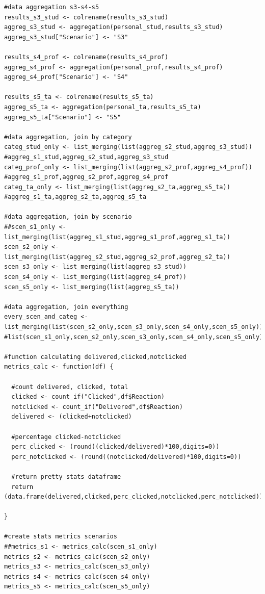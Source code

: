 \documentclass[a4paper]{article}
\begin{document}
\begin{lstlisting}
#data aggregation s3-s4-s5
results_s3_stud <- colrename(results_s3_stud)
aggreg_s3_stud <- aggregation(personal_stud,results_s3_stud)
aggreg_s3_stud["Scenario"] <- "S3"

results_s4_prof <- colrename(results_s4_prof)
aggreg_s4_prof <- aggregation(personal_prof,results_s4_prof)
aggreg_s4_prof["Scenario"] <- "S4"

results_s5_ta <- colrename(results_s5_ta)
aggreg_s5_ta <- aggregation(personal_ta,results_s5_ta)
aggreg_s5_ta["Scenario"] <- "S5"

#data aggregation, join by category
categ_stud_only <- list_merging(list(aggreg_s2_stud,aggreg_s3_stud)) #aggreg_s1_stud,aggreg_s2_stud,aggreg_s3_stud
categ_prof_only <- list_merging(list(aggreg_s2_prof,aggreg_s4_prof)) #aggreg_s1_prof,aggreg_s2_prof,aggreg_s4_prof
categ_ta_only <- list_merging(list(aggreg_s2_ta,aggreg_s5_ta)) #aggreg_s1_ta,aggreg_s2_ta,aggreg_s5_ta

#data aggregation, join by scenario
##scen_s1_only <- list_merging(list(aggreg_s1_stud,aggreg_s1_prof,aggreg_s1_ta))
scen_s2_only <- list_merging(list(aggreg_s2_stud,aggreg_s2_prof,aggreg_s2_ta))
scen_s3_only <- list_merging(list(aggreg_s3_stud))
scen_s4_only <- list_merging(list(aggreg_s4_prof))
scen_s5_only <- list_merging(list(aggreg_s5_ta))

#data aggregation, join everything
every_scen_and_categ <- list_merging(list(scen_s2_only,scen_s3_only,scen_s4_only,scen_s5_only)) #list(scen_s1_only,scen_s2_only,scen_s3_only,scen_s4_only,scen_s5_only)

#function calculating delivered,clicked,notclicked
metrics_calc <- function(df) {
  
  #count delivered, clicked, total
  clicked <- count_if("Clicked",df$Reaction)
  notclicked <- count_if("Delivered",df$Reaction)
  delivered <- (clicked+notclicked)
  
  #percentage clicked-notclicked
  perc_clicked <- (round((clicked/delivered)*100,digits=0))
  perc_notclicked <- (round((notclicked/delivered)*100,digits=0))
  
  #return pretty stats dataframe
  return (data.frame(delivered,clicked,perc_clicked,notclicked,perc_notclicked))
  
}

#create stats metrics scenarios
##metrics_s1 <- metrics_calc(scen_s1_only)
metrics_s2 <- metrics_calc(scen_s2_only)
metrics_s3 <- metrics_calc(scen_s3_only)
metrics_s4 <- metrics_calc(scen_s4_only)
metrics_s5 <- metrics_calc(scen_s5_only)


\end{lstlisting}
\end{document}
